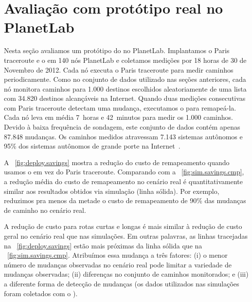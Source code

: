 \section{Avaliação com protótipo real no PlanetLab}
\label{sec:deploy}

Nesta seção avaliamos um protótipo do \rmprt{} no PlanetLab.
Implantamos o Paris traceroute e o \rmprt{} em 140 nós PlanetLab e
coletamos medições por 18 horas de 30 de Novembro de 2012.  Cada nó
executa o Paris traceroute para medir caminhos periodicamente.  Como no
conjunto de dados utilizado nas seções anteriores, cada nó monitora
caminhos para 1.000 destinos escolhidos aleatoriamente de uma lista com
34.820 destinos alcançáveis na Internet.  Quando duas medições
consecutivas com Paris traceroute detectam uma mudança, executamos o
\rmprt{} para remapeá-la.  Cada nó leva em média 7~horas e 42~minutos
para medir os 1.000 caminhos.  Devido à baixa frequência de sondagem,
este conjunto de dados contém apenas 87.848 mudanças.  Os caminhos
medidos atravessam 7.143 sistemas autônomos e 95\% dos sistemas
autônomos de grande porte na Internet~\cite{oliveira08as2tier}.

A \figstr~\ref{fig:deploy.savings} mostra a redução do custo de
remapeamento quando usamos o \rmprt{} em vez do Paris traceroute.
Comparando com a \figstr~\ref{fig:sim.savings.cmp}, a redução média do
custo de remapeamento no cenário real é quantitativamente similar aos
resultados obtidos via simulação (linha sólida).  Por exemplo, reduzimos
pra menos da metade o custo de remapeamento de 90\% das mudanças de
caminho no cenário real.

A redução de custo para rotas curtas e longas é mais similar à redução
de custo geral no cenário real que nas simulações.  Em outras palavras,
as linhas tracejadas na \figstr~\ref{fig:deploy.savings} estão mais
próximas da linha sólida que na \figstr~\ref{fig:sim.savings.cmp}.
Atribuímos essa mudança a três fatores: (i) o menor número de mudanças
observadas no cenário real pode limitar a variedade de mudanças
observadas; (ii) diferenças no conjunto de caminhos monitorados; e (iii)
a diferente forma de detecção de mudanças (os dados utilizados nas
simulações foram coletados com o \dtrack{}).

